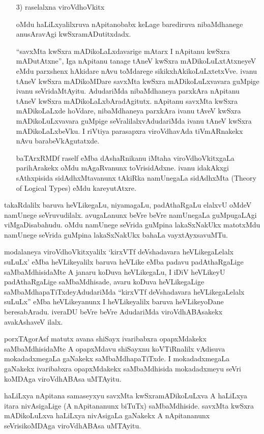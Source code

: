 \begin{itemize}
\item[{\rm 3)}] raselalxna viroVdhoVkitx

oMdu haLiLxyalilxruva nApitanobabx keLage barediruva nibaMdhanege anusAra\-vAgi kwSxramADutitxdadx.

``savxMta kwSxra mADikoLaLxdavarige mAtarx I nApitanu kwSxra mADutAtxne'', Iga nApitanu tanage tAneV kwSxra mADikoLuLxtAtxneyeV eMdu parxshenx hAkidare nAvu toMdarege sikikxhAkikoLuLxtetxVve. ivanu tAneV kwSxra mADikoMDare savxMta kwSxra mADikoLuLxvavara guMpige ivanu seVridaMtAyitu. AdudariMda nibaMdhaneya parxkAra nApitanu tAneV kwSxra mADikoLaLxbAradAgitutx. nApitanu savxMta kwSxra mADikoLaLxde hoVdare, nibaMdhaneya parxkAra ivanu tAveV kwSxra mADikoLuLxvavara guMpige seVralilalxvAdudariMda ivanu tAneV kwSxra mADikoLaLxbeVku. I riVtiya parasapxra viroVdhavAda tiVmARnakekx nAvu barabeVkAgutatxde.

baTArxRMDf raself eMba dAshaRnikanu iMtaha viroVdhoVkitxgaLa parihArakekx oMdu mAgaRvanunx toVrisidAdxne. ivanu idakAkxgi sAthxpisida sidAdhxMtavanunx tAkiRka namUnegaLa sidAdhxMta {\rm (Theory of Logical Types)} eMdu kareyutAtxre.
\end{itemize}

takaRdalilx baruva heVLikegaLu, niyamagaLu, padAthaRgaLu elalxvU oMdeV namUnege seVruvudilalx. avugaLanunx beVre beVre namUnegaLa guMpugaLAgi viMgaDisa\-bahudu. oMdu namUnege seVrida guMpina lakaSxNakUkx matotxMdu namUnege seVrida guMpina lakaSxNakUkx bahaLa vayxtAyxsavuMTu.

modalaneya viroVdhoVkitxyalilx `kirxVTf deVshadavara heVLikegaLelalx suLuLx' eMba heVLikeyalilx baruva heVLike eMba padavu padAthaRgaLige saMbaMdhisidaMte A janaru koDuva heVLikegaLu, I iDiV heVLikeyU padAthaRgaLige saMbaMdhisade, avaru koDuva heVLikegaLige saMbaMdhapaTiTxdeyAdudariMda ``kirxVTf deVshadavara heVLikegaLelalx suLuLx'' eMba heVLikeyanunx I heVLikeyalilx baruva heVLikeyoDane beresabAradu. iveraDU beVre beVre AdudariMda viroVdhABAsakekx avakAshaveV ilalx.

porxTAgorAsf matutx avana shiSayx ivaribabxra opapxMdakekx saMbaMdhisidaMte A opapxMdavu shiSayxnu koVTiRnalilx vAdisuva mokadadxmegaLa gaNakekx saMbaMdhapaTiTxde. I mokadadxmegaLa gaNakekx ivaribabxra opapxMdakekx saMbaMdhisida mokadadxmeyu seVri koMDAga viroVdhABAsa uMTAyitu.

haLiLxya nApitana samaseyxyu savxMta kwSxramADikoLuLxva A haLiLxya itara nivAsigaLige (A nApitananunx biTuTx) saMbaMdhiside. savxMta kwSxra mADikoLuLxva haLiLxya nivAsigaLa gaNakekx A nApitananunx seVrisikoMDAga viroVdhABAsa uMTAyitu.

